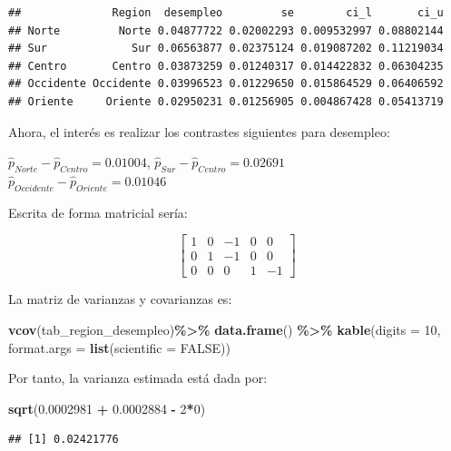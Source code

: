 \documentclass[
  12pt,
]{book}
\newenvironment{Shaded}{\begin{snugshade}}{\end{snugshade}}
\newcommand{\AttributeTok}[1]{\textcolor[rgb]{0.13,0.29,0.53}{#1}}
\newcommand{\ConstantTok}[1]{\textcolor[rgb]{0.56,0.35,0.01}{#1}}
\newcommand{\DecValTok}[1]{\textcolor[rgb]{0.00,0.00,0.81}{#1}}
\newcommand{\FloatTok}[1]{\textcolor[rgb]{0.00,0.00,0.81}{#1}}
\newcommand{\FunctionTok}[1]{\textcolor[rgb]{0.13,0.29,0.53}{\textbf{#1}}}
\newcommand{\NormalTok}[1]{#1}
\newcommand{\SpecialCharTok}[1]{\textcolor[rgb]{0.81,0.36,0.00}{\textbf{#1}}}
\begin{document}
\begin{verbatim}
##              Region  desempleo         se        ci_l       ci_u
## Norte         Norte 0.04877722 0.02002293 0.009532997 0.08802144
## Sur             Sur 0.06563877 0.02375124 0.019087202 0.11219034
## Centro       Centro 0.03873259 0.01240317 0.014422832 0.06304235
## Occidente Occidente 0.03996523 0.01229650 0.015864529 0.06406592
## Oriente     Oriente 0.02950231 0.01256905 0.004867428 0.05413719
\end{verbatim}

Ahora, el interés es realizar los contrastes siguientes para desempleo:

\(\hat{p}_{Norte} - \hat{p}_{Centro} = 0.01004\),
\(\hat{p}_{Sur} - \hat{p}_{Centro} = 0.02691\)\\
\(\hat{p}_{Occidente} - \hat{p}_{Oriente} = 0.01046\)

Escrita de forma matricial sería:

\[
\left[\begin{array}{ccccc}
1 & 0 & -1 & 0 & 0\\
0 & 1 & -1 & 0 & 0\\
0 & 0 & 0 & 1 & -1
\end{array}\right]
\]

La matriz de varianzas y covarianzas es:

\begin{Shaded}
\begin{Highlighting}[]
\FunctionTok{vcov}\NormalTok{(tab\_region\_desempleo)}\SpecialCharTok{\%\textgreater{}\%}
  \FunctionTok{data.frame}\NormalTok{() }\SpecialCharTok{\%\textgreater{}\%} 
  \FunctionTok{kable}\NormalTok{(}\AttributeTok{digits =} \DecValTok{10}\NormalTok{,}
        \AttributeTok{format.args =} \FunctionTok{list}\NormalTok{(}\AttributeTok{scientific =} \ConstantTok{FALSE}\NormalTok{))}
\end{Highlighting}
\end{Shaded}

Por tanto, la varianza estimada está dada por:

\begin{Shaded}
\begin{Highlighting}[]
\FunctionTok{sqrt}\NormalTok{(}\FloatTok{0.0002981} \SpecialCharTok{+} \FloatTok{0.0002884} \SpecialCharTok{{-}} \DecValTok{2}\SpecialCharTok{*}\DecValTok{0}\NormalTok{)}
\end{Highlighting}
\end{Shaded}

\begin{verbatim}
## [1] 0.02421776
\end{verbatim}
\end{document}
